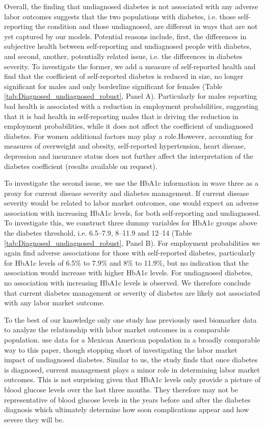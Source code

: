 \documentclass[12pt,english]{article}
\begin{document}
{Overall, the finding that undiagnosed diabetes is not associated with any adverse labor outcomes suggests that the two populations with diabetes, i.e. those self-reporting the condition and those undiagnosed, are different in ways that are not yet captured by our models. Potential reasons include, first, the differences in subjective health between self-reporting and undiagnosed people with diabetes, and second, another, potentially related issue, i.e. the differences in diabetes severity. To investigate the former, we add a measure of self-reported health and find that the coefficient of self-reported diabetes is reduced in size, no longer significant for males and only borderline significant for females (Table \ref{tab:Diagnosed_undiagnosed_robust}, Panel A). Particularly for males reporting bad health is associated with a reduction in employment probabilities, suggesting that it is bad health in self-reporting males that is driving the reduction in employment probabilities, while it does not affect the coefficient of undiagnosed diabetes. For women additional factors may play a role.However, accounting for measures of overweight and obesity, self-reported hypertension, heart disease, depression and insurance status does not further affect the interpretation of the diabetes coefficient (results available on request).


To investigate the second issue, we use the \ac{HbA1c} information in wave three as a proxy for current disease
severity and diabetes management. If current disease severity would be related to labor market outcomes, one would expect an adverse association with increasing \ac{HbA1c} levels, for both self-reporting and undiagnosed. To investigate this, we construct three dummy variables for \ac{HbA1c} groups above the
diabetes threshold, i.e. 6.5--7.9, 8--11.9 and 12--14 (Table \ref{tab:Diagnosed_undiagnosed_robust}, Panel B). For employment probabilities we again find adverse associations for
those with self-reported diabetes, particularly for \ac{HbA1c} levels of 6.5\% to 7.9\%
and 8\% to 11.9\%, but no indication that the association would increase with higher \ac{HbA1c} levels. For undiagnosed diabetes, no association with increasing \ac{HbA1c} levels is observed. We therefore conclude that current diabetes management or severity of diabetes are likely not associated with any labor market outcome.

To the best of our knowledge only one study has previously used biomarker data to analyze the relationship with labor market outcomes in a comparable population. \textcite{BrownIII2011} use data for a Mexican American
population in a broadly comparable way to this paper, though stopping short of investigating
the labor market impact of undiagnosed diabetes. Similar to us, the study finds that once diabetes is diagnosed, current management plays a minor role in determining labor market outcomes. This is not surprising given that \ac{HbA1c} levels only provide a picture of blood glucose levels over the last three months. They therefore may not be representative of blood glucose levels in the years before and after the diabetes diagnosis which ultimately determine how soon complications appear and how severe they will be.

}
\end{document}
